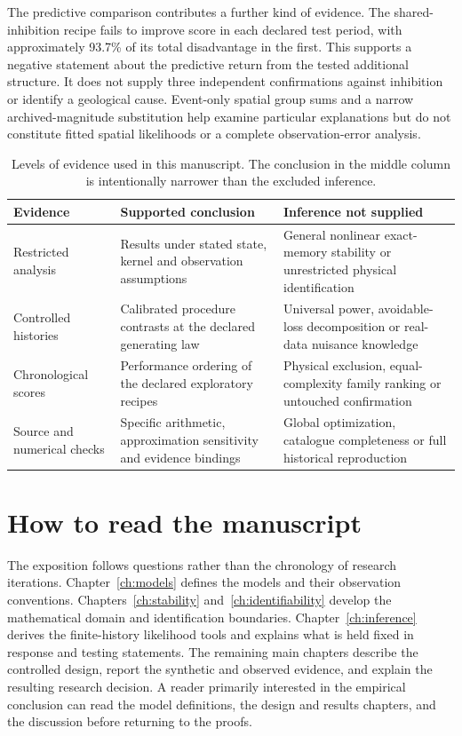 The predictive comparison contributes a further kind of evidence. The shared-inhibition recipe fails to improve score in each declared test period, with approximately 93.7\% of its total disadvantage in the first. This supports a negative statement about the predictive return from the tested additional structure. It does not supply three independent confirmations against inhibition or identify a geological cause. Event-only spatial group sums and a narrow archived-magnitude substitution help examine particular explanations but do not constitute fitted spatial likelihoods or a complete observation-error analysis.

\begin{table}[tbp]
\centering
\small
\caption{Levels of evidence used in this manuscript. The conclusion in the middle column is intentionally narrower than the excluded inference.}
\label{tab:evidence_levels}
\begin{tabularx}{\textwidth}{@{}>{\raggedright\arraybackslash}p{}>{\raggedright\arraybackslash}X>{\raggedright\arraybackslash}X@{}}
\toprule
Evidence & Supported conclusion & Inference not supplied \\
\midrule
Restricted analysis & Results under stated state, kernel and observation assumptions & General nonlinear exact-memory stability or unrestricted physical identification \\
Controlled histories & Calibrated procedure contrasts at the declared generating law & Universal power, avoidable-loss decomposition or real-data nuisance knowledge \\
Chronological scores & Performance ordering of the declared exploratory recipes & Physical exclusion, equal-complexity family ranking or untouched confirmation \\
Source and numerical checks & Specific arithmetic, approximation sensitivity and evidence bindings & Global optimization, catalogue completeness or full historical reproduction \\
\bottomrule
\end{tabularx}
\end{table}

\section{How to read the manuscript}

The exposition follows questions rather than the chronology of research iterations. Chapter~\ref{ch:models} defines the models and their observation conventions. Chapters~\ref{ch:stability} and~\ref{ch:identifiability} develop the mathematical domain and identification boundaries. Chapter~\ref{ch:inference} derives the finite-history likelihood tools and explains what is held fixed in response and testing statements. The remaining main chapters describe the controlled design, report the synthetic and observed evidence, and explain the resulting research decision. A reader primarily interested in the empirical conclusion can read the model definitions, the design and results chapters, and the discussion before returning to the proofs.

